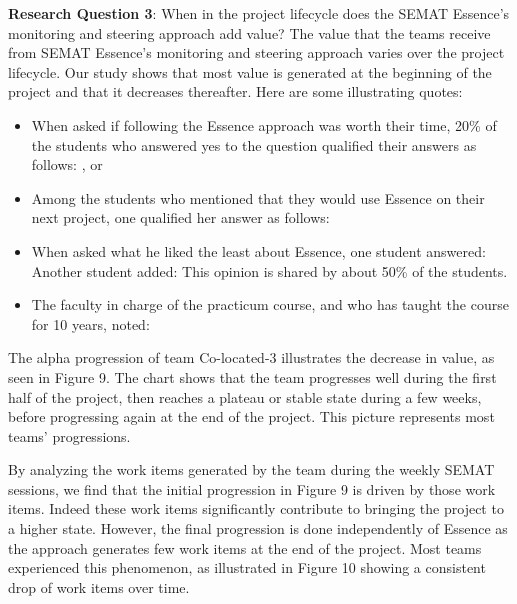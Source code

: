 \textbf{Research Question 3}: When in the project lifecycle does the SEMAT Essence's monitoring and steering approach add value?
The value that the teams receive from SEMAT Essence's monitoring and steering approach varies over the project lifecycle. Our study shows that most value is generated at the beginning of the project and that it decreases thereafter. Here are some illustrating quotes:
\begin{itemize}
    \item When asked if following the Essence approach was worth their time, 20\% of the students who answered yes to the question qualified their answers as follows: , or 
    
    \item Among the students who mentioned that they would use Essence on their next project, one qualified her answer as follows: 
    
    \item When asked what he liked the least about Essence, one student answered:  Another student added:  This opinion is shared by about 50\% of the students.
    
    \item The faculty in charge of the practicum course, and who has taught the course for 10 years, noted: 
\end{itemize}

The alpha progression of team Co-located-3 illustrates the decrease in value, as seen in Figure 9. The chart shows that the team progresses well during the first half of the project, then reaches a plateau or stable state during a few weeks, before progressing again at the end of the project. This picture represents most teams' progressions.

By analyzing the work items generated by the team during the weekly SEMAT sessions, we find that the initial progression in Figure 9 is driven by those work items. Indeed these work items significantly contribute to bringing the project to a higher state. However, the final progression is done independently of Essence as the approach generates few work items at the end of the project. Most teams experienced this phenomenon, as illustrated in Figure 10 showing a consistent drop of work items over time.

